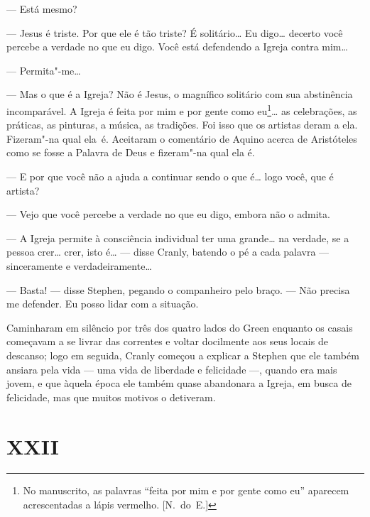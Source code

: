 --- Está mesmo?

--- Jesus é triste.  Por que ele é tão triste?  É solitário\ldots{}  Eu digo\ldots{}
decerto você percebe a verdade no que eu digo.  Você está defendendo a Igreja
contra mim\ldots{}

--- Permita"-me\ldots{}

--- Mas o que é a Igreja?  Não é Jesus, o magnífico solitário com sua
abstinência incomparável.  A Igreja é feita por mim e por gente como
eu\footnote{ No manuscrito, as palavras “feita por mim e por gente como eu”
aparecem acrescentadas a lápis vermelho. [N.~do~E.]}\ldots{} as celebrações, as
práticas, as pinturas, a música, as tradições.  Foi isso que os artistas deram
a ela.  Fizeram"-na qual \mbox{ela é}.  Aceitaram o comentário de Aquino acerca de
Aristóteles como se fosse a Palavra de Deus e fizeram"-na qual ela é.

--- E por que você não a ajuda a continuar sendo o que é\ldots{} logo você, que é
artista?

--- Vejo que você percebe a verdade no que eu digo, embora não o admita.

--- A Igreja permite à consciência individual ter uma grande\ldots{} na verdade, se a pessoa
crer\ldots{} crer, isto é\ldots{} --- disse Cranly, batendo o pé a cada palavra ---
sinceramente e verdadeiramente\ldots{}

--- Basta! --- disse Stephen, pegando o companheiro pelo braço.  --- Não
precisa me defender.  Eu posso lidar com a situação.

Caminharam em silêncio por três dos quatro lados do Green enquanto os casais
começavam a se livrar das correntes e voltar docilmente aos seus locais de		
descanso; logo em seguida, Cranly começou a explicar a Stephen que ele também		
ansiara pela vida --- uma vida de liberdade e felicidade ---, quando era mais
jovem, e que àquela época ele também quase abandonara a Igreja, em busca de
felicidade, mas que muitos motivos o detiveram.


\section{XXII}

